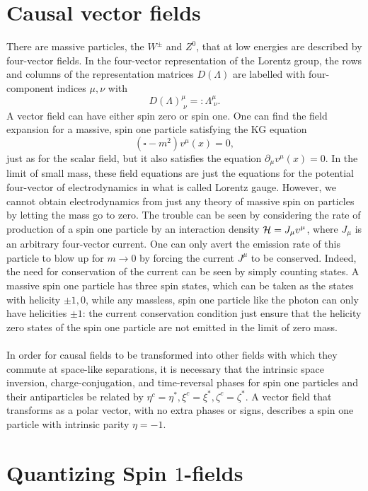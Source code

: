 \section{Causal vector fields}
There are massive particles, the $W^\pm$ and $Z^0$, that at low energies are described by four-vector fields. In the four-vector representation of the Lorentz group, the rows and columns of the representation matrices $D(\Lambda)$ are labelled with four-component indices $\mu,\nu$ with
\begin{equation}
D(\Lambda)^\mu_{\;\nu} =: \Lambda^\mu_{\;\nu}.
\end{equation}
A vector field can have either spin zero or spin one. One can find the field expansion for a massive, spin one particle satisfying the KG equation\begin{equation*}
(\square - m^2) v^\mu(x) = 0,
\end{equation*}
just as for the scalar field, but it also satisfies the equation $\partial_\mu v^\mu(x)=0$. In the limit of small mass, these field equations are just the equations for the potential four-vector of electrodynamics in what is called Lorentz gauge. However, we cannot obtain electrodynamics from just any theory of massive spin on particles by letting the mass go to zero. The trouble can be seen by considering the rate of production of a spin one particle by an interaction density $\mathcal{H} = J_\mu v^\mu$, where $J_\mu$ is an arbitrary four-vector current. One can only avert the emission rate of this particle to blow up for $m\rightarrow 0$ by forcing the current $J^\mu$ to be conserved. Indeed, the need for conservation of the current can be seen by simply counting states. A massive spin one particle has three spin states, which can be taken as the states with helicity $\pm1,0$, while any massless, spin one particle like the photon can only have helicities $\pm1$: the current conservation condition just ensure that the helicity zero states of the spin one particle are not emitted in the limit of zero mass.\\
\\
In order for causal fields to be transformed into other fields with which they commute at space-like separations, it is necessary that the intrinsic space inversion, charge-conjugation, and time-reversal phases for spin one particles and their antiparticles be related by $\eta^c = \eta^*, \xi^c=\xi^*, \zeta^c=\zeta^*$. A vector field that transforms as a polar vector, with no extra phases or signs, describes a spin one particle with intrinsic parity $\eta=-1$.
\section{Quantizing Spin $1$-fields}
